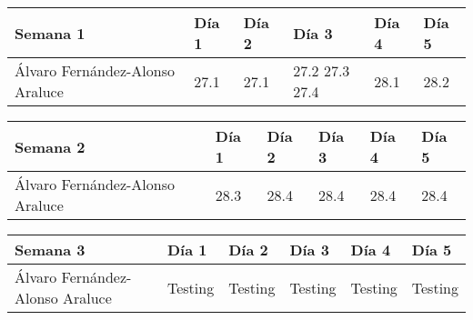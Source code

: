 \begin{table}[h]
	\centering
	\begin{tabular}{| p{2cm} | p{2cm} | p{2cm} | p{2cm} | p{2cm} | p{2cm} |}
		\rowcolor[HTML]{329A9D} 
		{\color[HTML]{FFFFFF} \textbf{Semana 1}} & {\color[HTML]{FFFFFF} \textbf{Día 1}} & {\color[HTML]{FFFFFF} \textbf{Día 2}} & {\color[HTML]{FFFFFF} \textbf{Día 3}} & {\color[HTML]{FFFFFF} \textbf{Día 4}}  & {\color[HTML]{FFFFFF} \textbf{Día 5}} \\ \hline
		Álvaro Fernández-Alonso Araluce & 27.1 & 27.1 & 27.2 27.3 27.4 & 28.1 & 28.2 \\ \hline
	\end{tabular}
\end{table}

\begin{table}[h]
	\centering
	\begin{tabular}{| p{2cm} | p{2cm} | p{2cm} | p{2cm} | p{2cm} | p{2cm} |}
		\rowcolor[HTML]{329A9D} 
		{\color[HTML]{FFFFFF} \textbf{Semana 2}} & {\color[HTML]{FFFFFF} \textbf{Día 1}} & {\color[HTML]{FFFFFF} \textbf{Día 2}} & {\color[HTML]{FFFFFF} \textbf{Día 3}} & {\color[HTML]{FFFFFF} \textbf{Día 4}}  & {\color[HTML]{FFFFFF} \textbf{Día 5}} \\ \hline
		Álvaro Fernández-Alonso Araluce & 28.3 & 28.4 & 28.4 & 28.4 & 28.4 \\ \hline
	\end{tabular}
\end{table}

\begin{table}[h]
	\centering
	\begin{tabular}{| p{2cm} | p{2cm} | p{2cm} | p{2cm} | p{2cm} | p{2cm} |}
		\rowcolor[HTML]{329A9D} 
		{\color[HTML]{FFFFFF} \textbf{Semana 3}} & {\color[HTML]{FFFFFF} \textbf{Día 1}} & {\color[HTML]{FFFFFF} \textbf{Día 2}} & {\color[HTML]{FFFFFF} \textbf{Día 3}} & {\color[HTML]{FFFFFF} \textbf{Día 4}}  & {\color[HTML]{FFFFFF} \textbf{Día 5}} \\ \hline
		Álvaro Fernández-Alonso Araluce & Testing & Testing & Testing &Testing & Testing \\ \hline
	\end{tabular}
\end{table}

